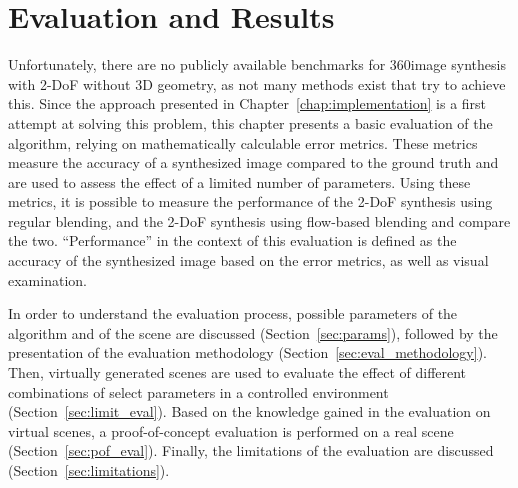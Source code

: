 \chapter{Evaluation and Results} \label{chap:evaluation}
Unfortunately, there are no publicly available benchmarks for 360\degree image synthesis with 2-DoF without 3D geometry, as not many methods exist that try to achieve this. Since the approach presented in Chapter~\ref{chap:implementation} is a first attempt at solving this problem, this chapter presents a basic evaluation of the algorithm, relying on mathematically calculable error metrics. These metrics measure the accuracy of a synthesized image compared to the ground truth and are used to assess the effect of a limited number of parameters. Using these metrics, it is possible to measure the performance of the 2-DoF synthesis using regular blending, and the 2-DoF synthesis using flow-based blending and compare the two.
``Performance'' in the context of this evaluation is defined as the accuracy of the synthesized image based on the error metrics, as well as visual examination.

In order to understand the evaluation process,
 possible parameters of the algorithm and of the scene are discussed (Section~\ref{sec:params}), followed by the presentation of the evaluation methodology (Section~\ref{sec:eval_methodology}).
Then, virtually generated scenes are used to evaluate the effect of different combinations of select parameters in a controlled environment (Section~\ref{sec:limit_eval}).
Based on the knowledge gained in the evaluation on virtual scenes, a proof-of-concept evaluation is performed on a real scene (Section~\ref{sec:pof_eval}). Finally, the limitations of the evaluation are discussed (Section~\ref{sec:limitations}).




